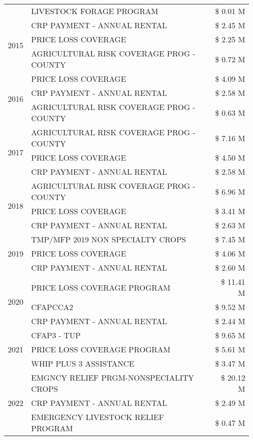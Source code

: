 \begin{tabular}{llr}
 & LIVESTOCK FORAGE PROGRAM & \$ 0.01 M \\
\cline{1-3}
\multirow[t]{3}{*}{2015} & CRP PAYMENT - ANNUAL RENTAL & \$ 2.45 M \\
 & PRICE LOSS COVERAGE & \$ 2.25 M \\
 & AGRICULTURAL RISK COVERAGE PROG - COUNTY & \$ 0.72 M \\
\cline{1-3}
\multirow[t]{3}{*}{2016} & PRICE LOSS COVERAGE & \$ 4.09 M \\
 & CRP PAYMENT - ANNUAL RENTAL & \$ 2.58 M \\
 & AGRICULTURAL RISK COVERAGE PROG - COUNTY & \$ 0.63 M \\
\cline{1-3}
\multirow[t]{3}{*}{2017} & AGRICULTURAL RISK COVERAGE PROG - COUNTY & \$ 7.16 M \\
 & PRICE LOSS COVERAGE & \$ 4.50 M \\
 & CRP PAYMENT - ANNUAL RENTAL & \$ 2.58 M \\
\cline{1-3}
\multirow[t]{3}{*}{2018} & AGRICULTURAL RISK COVERAGE PROG - COUNTY & \$ 6.96 M \\
 & PRICE LOSS COVERAGE & \$ 3.41 M \\
 & CRP PAYMENT - ANNUAL RENTAL & \$ 2.63 M \\
\cline{1-3}
\multirow[t]{3}{*}{2019} & TMP/MFP 2019 NON SPECIALTY CROPS & \$ 7.45 M \\
 & PRICE LOSS COVERAGE & \$ 4.06 M \\
 & CRP PAYMENT - ANNUAL RENTAL & \$ 2.60 M \\
\cline{1-3}
\multirow[t]{3}{*}{2020} & PRICE LOSS COVERAGE PROGRAM & \$ 11.41 M \\
 & CFAPCCA2 & \$ 9.52 M \\
 & CRP PAYMENT - ANNUAL RENTAL & \$ 2.44 M \\
\cline{1-3}
\multirow[t]{3}{*}{2021} & CFAP3 - TUP & \$ 9.65 M \\
 & PRICE LOSS COVERAGE PROGRAM & \$ 5.61 M \\
 & WHIP PLUS 3 ASSISTANCE & \$ 3.47 M \\
\cline{1-3}
\multirow[t]{3}{*}{2022} & EMGNCY RELIEF PRGM-NONSPECIALITY CROPS & \$ 20.12 M \\
 & CRP PAYMENT - ANNUAL RENTAL & \$ 2.49 M \\
 & EMERGENCY LIVESTOCK RELIEF PROGRAM & \$ 0.47 M \\
\cline{1-3}
\bottomrule
\end{tabular}

